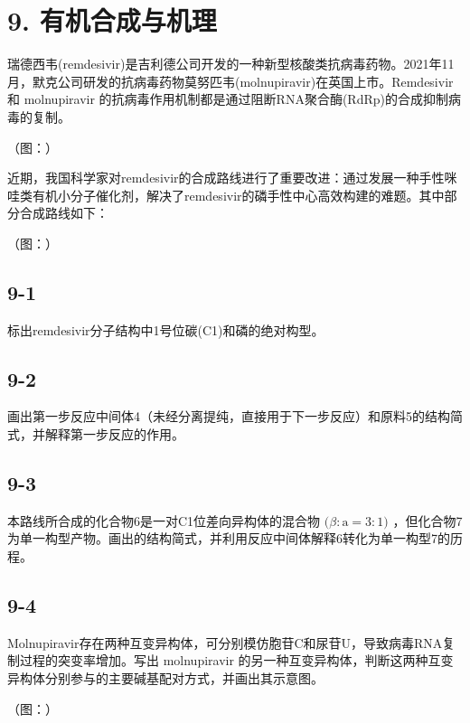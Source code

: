\section*{9. 有机合成与机理}
瑞德西⻙(remdesivir)是吉利德公司开发的⼀种新型核酸类抗病毒药物。2021年11⽉，默克公司研发的抗病毒药物莫努匹⻙(molnupiravir)在英国上市。Remdesivir 和 molnupiravir 的抗病毒作⽤机制都是通过阻断RNA聚合酶(RdRp)的合成抑制病毒的复制。

（图：）

近期，我国科学家对remdesivir的合成路线进⾏了重要改进：通过发展⼀种⼿性咪哇类有机⼩分⼦催化剂，解决了remdesivir的磷⼿性中⼼⾼效构建的难题。其中部分合成路线如下：

（图：）

\subsection*{9-1}
标出remdesivir分⼦结构中1号位碳(C1)和磷的绝对构型。

\subsection*{9-2}
画出第⼀步反应中间体4（未经分离提纯，直接⽤于下⼀步反应）和原料5的结构简式，并解释第⼀步反应的作⽤。

\subsection*{9-3}
本路线所合成的化合物6是⼀对C1位差向异构体的混合物 $( \beta \mathrm { { : a } } = 3 \mathrm { { : 1 } ) }$ ，但化合物7为单⼀构型产物。画出的结构简式，并利⽤反应中间体解释6转化为单⼀构型7的历程。

\subsection*{9-4}
Molnupiravir存在两种互变异构体，可分别模仿胞苷C和尿苷U，导致病毒RNA复制过程的突变率增加。写出 molnupiravir 的另⼀种互变异构体，判断这两种互变异构体分别参与的主要碱基配对⽅式，并画出其⽰意图。

（图：）
